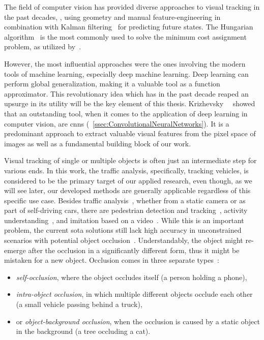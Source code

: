 The field of computer vision has provided diverse approaches to visual tracking in the past decades, \egtext{}, using geometry and manual feature-engineering in combination with Kalman filtering~\cite{kalman1960linearfilter} for predicting future states. The Hungarian algorithm~\cite{kuhn1995hungarian} is the most commonly used to solve the minimum cost assignment problem, as utilized by~\cite{bawley2016simple}.

However, the most influential approaches were the ones involving the modern tools of machine learning, especially deep machine learning. Deep learning can perform global generalization, making it a valuable tool as a function approximator. This revolutionary idea which has in the past decade reaped an upsurge in its utility will be the key element of this thesis. Krizhevsky~\etal{}~\cite{krizhevsky2012classification} showed that an outstanding tool, when it comes to the application of deep learning in computer vision, are \glspl{cnn} (\sectiontext{}~\ref{ssec:ConvolutionalNeuralNetworks}). It is a predominant approach to extract valuable visual features from the pixel space of images as well as a fundamental building block of our work.

Visual tracking of single or multiple objects is often just an intermediate step for various ends. In this work, the traffic analysis, specifically, tracking vehicles, is considered to be the primary target of our applied research, even though, as we will see later, our developed methods are generally applicable regardless of this specific use case. Besides traffic analysis~\cite{tang2019cityflow}, whether from a static camera or as part of self-driving cars, there are pedestrian detection and tracking~\cite{lealtaixe2017tracking}, activity understanding~\cite{finn2017oneshotimitation}, and imitation based on a video~\cite{peng2018sfv}. While this is an important problem, the current \gls{sota} solutions still lack high accuracy in unconstrained scenarios with potential object occlusion~\cite{jiyan2007robustocclusion}. Understandably, the object might re-emerge after the occlusion in a significantly different form, thus it might be mistaken for a new object. Occlusion comes in three separate types~\cite{gabriel2003sotamot}:
\begin{itemize}
    \item \emph{self-occlusion}, where the object occludes itself (a person holding a phone),
    \item \emph{intra-object occlusion}, in which multiple different objects occlude each other (a small vehicle passing behind a truck),
    \item or \emph{object-background occlusion}, when the occlusion is caused by a static object in the background (a tree occluding a cat).
\end{itemize}

